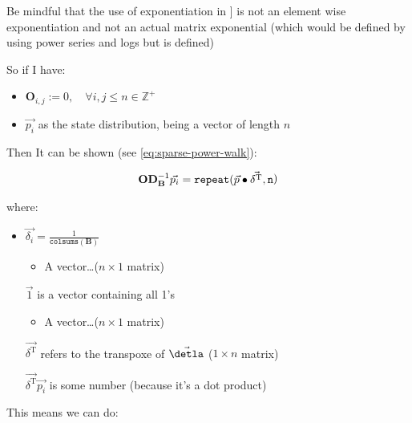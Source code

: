 \documentclass[11pt]{article}
\begin{document}
Be mindful that the use of exponentiation in
] is not an element wise exponentiation
and not an actual matrix exponential (which would be defined by using
power series and logs but is defined)

So if I have:

\begin{itemize}
\item \(\mathbf{O}_{i, j} := 0, \quad \forall i,j\leq n \in \mathbb{Z}^+\)

\item \(\vec{p_i}\) as the state distribution, being a vector of length \(n\)
\end{itemize}

Then It can be shown (see \eqref{eq:sparse-power-walk}):

$$\begin{aligned}
    \mathbf{O} \mathbf{D}_{\mathbf{B}}^{-1} \vec{p_i} = \mathtt{repeat} (\vec{p} \bullet \vec{\delta^{\tiny \mathrm{T}}} \mathtt{, n}\end{aligned})$$



where:

\begin{itemize}
\item \(\vec{\delta_i} = \frac{1}{\mathtt{colsums} \left( \mathbf{B} \right)}\)
\begin{itemize}
\item A vector\ldots{}(\(n\times 1\) matrix)
\end{itemize}
\item[{\(\vec{1}\) }] is a vector containing all 1's
\begin{itemize}
\item A vector\ldots{}(\(n\times 1\) matrix)
\end{itemize}
\item[{\(\vec{\delta^{\mathrm{T}}}\)}] refers to the transpoxe of \(\vec{\detla}\) (\(1\times n\) matrix)
\item[{\(\vec{\delta^{\mathrm{T}}} \vec{p_{i}}\)}] is some number (because it's a dot product)
\end{itemize}

This means we can do:
\end{document}
